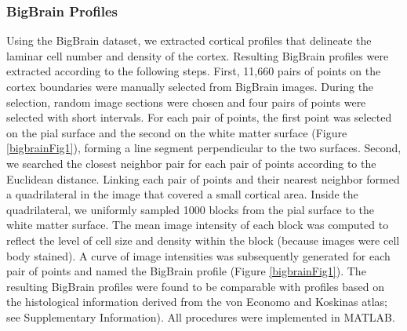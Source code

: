 \begin{refsection}
\subsubsection*{BigBrain Profiles}
Using the BigBrain dataset, we extracted cortical profiles that delineate the laminar cell number and density of the cortex. Resulting BigBrain profiles were extracted according to the following steps. First, 11,660 pairs of points on the cortex boundaries were manually selected from BigBrain images. During the selection, random image sections were chosen and four pairs of points were selected with short intervals. For each pair of points, the first point was selected on the pial surface and the second on the white matter surface (Figure \ref{bigbrainFig1}), forming a line segment perpendicular to the two surfaces. Second, we searched the closest neighbor pair for each pair of points according to the Euclidean distance. Linking each pair of points and their nearest neighbor formed a quadrilateral in the image that covered a small cortical area. Inside the quadrilateral, we uniformly sampled 1000 blocks from the pial surface to the white matter surface. The mean image intensity of each block was computed to reflect the level of cell size and density within the block (because images were cell body stained). A curve of image intensities was subsequently generated for each pair of points and named the BigBrain profile (Figure \ref{bigbrainFig1}). The resulting BigBrain profiles were found to be comparable with profiles based on the histological information derived from the von Economo and Koskinas atlas; see Supplementary Information). All procedures were implemented in MATLAB.


\end{refsection}
